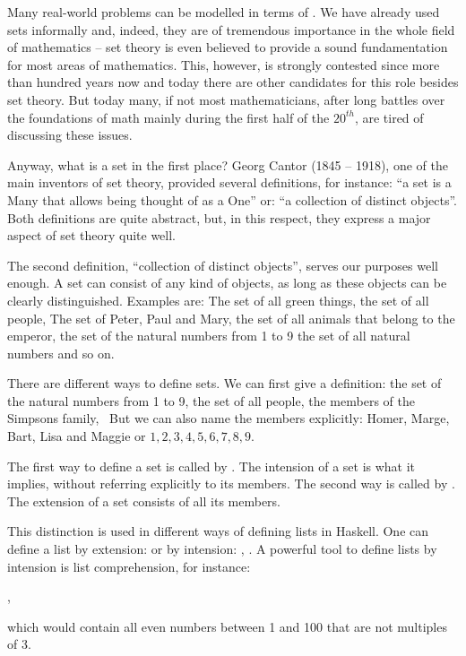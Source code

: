 \documentclass{scrreprt}
\newcommand{\texfamily}{\fontfamily{cmtex}\selectfont}
\newcommand{\Sp}{\hskip.33334em\relax}
\begin{document}
Many real-world problems can be modelled
in terms of .
We have already used sets informally
and, indeed, they are of tremendous importance
in the whole field of mathematics --
set theory is even believed to provide
a sound fundamentation for most areas of mathematics.
This, however, is strongly contested since more than
hundred years now and today 
there are other candidates for this role
besides set theory. But today
many, if not most mathematicians, 
after long battles
over the foundations of math
mainly during the first half of the $20^{th}$, 
are tired of discussing these issues.

Anyway, what is a set in the first place?
Georg Cantor (1845 -- 1918), one of the main inventors of set theory,
provided several definitions, 
for instance: 
``a set is a Many that allows being thought of as a One''
or: ``a collection of distinct objects''.
Both definitions are quite abstract,
but, in this respect, 
they express a major aspect of set theory quite well.

The second definition, ``collection of distinct objects'',
serves our purposes well enough. 
A set can consist of any kind of objects,
as long as these objects can be clearly distinguished.
Examples are: 
The set of all green things,
the set of all people,
The set of Peter, Paul and Mary,
the set of all animals that belong to the emperor,
the set of the natural numbers from 1 to 9
the set of all natural numbers
and so on.

There are different ways to define sets.
We can first give a definition:
the set of the natural numbers from 1 to 9,
the set of all people, 
the members of the Simpsons family, \etc\
But we can also name the members explicitly:
Homer, Marge, Bart, Lisa and Maggie or
$1,2,3,4,5,6,7,8,9$.

The first way to define a set is called 
by . The intension of a set is
what it implies, without referring explicitly
to its members.
The second way is called by .
The extension of a set consists of all its members.

This distinction is used in different ways of
defining lists in Haskell.
One can define a list by extension:
\haskell{[1,2,3,4,5]}
or by intension:
\haskell{[1..5]}, \haskell{[1..]}.
A powerful tool to define lists by intension 
is list comprehension, for instance:

\text{\texfamily [x\Sp |\Sp x\Sp \char'06\Sp [1..100],\Sp even\Sp x,\Sp x\Sp `mod`\Sp 3\Sp \char'32\Sp 0]},

which would contain all even numbers
between 1 and 100 that are not multiples of 3.
\end{document}
